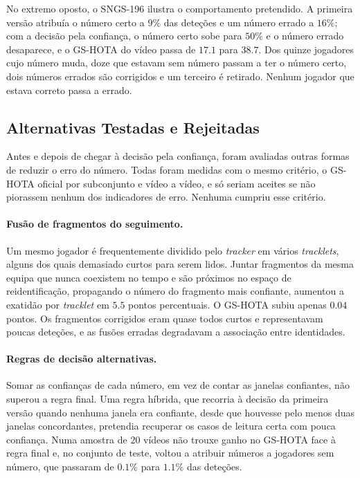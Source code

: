 No extremo oposto, o SNGS-196 ilustra o comportamento pretendido. A primeira versão atribuía o
número certo a $9\%$ das deteções e um número errado a $16\%$; com a decisão pela confiança, o
número certo sobe para $50\%$ e o número errado desaparece, e o GS-HOTA do vídeo passa de $17.1$
para $38.7$. Dos quinze jogadores cujo número muda, doze que estavam sem número passam a ter o
número certo, dois números errados são corrigidos e um terceiro é retirado. Nenhum jogador que
estava correto passa a errado.



\subsection{Alternativas Testadas e Rejeitadas}\label{sec:res_jnr_rejeitadas}

Antes e depois de chegar à decisão pela confiança, foram avaliadas outras formas de reduzir o erro
do número. Todas foram medidas com o mesmo critério, o GS-HOTA oficial por subconjunto e vídeo a
vídeo, e só seriam aceites se não piorassem nenhum dos indicadores de erro. Nenhuma cumpriu esse
critério.

\paragraph{Fusão de fragmentos do seguimento.} Um mesmo jogador é frequentemente dividido pelo
\emph{tracker} em vários \emph{tracklets}, alguns dos quais demasiado curtos para serem lidos.
Juntar fragmentos da mesma equipa que nunca coexistem no tempo e são próximos no espaço de
reidentificação, propagando o número do fragmento mais confiante, aumentou a exatidão por
\emph{tracklet} em $5.5$ pontos percentuais. O GS-HOTA subiu apenas $0.04$ pontos. Os fragmentos
corrigidos eram quase todos curtos e representavam poucas deteções, e as fusões erradas
degradavam a associação entre identidades.

\paragraph{Regras de decisão alternativas.} Somar as confianças de cada número, em vez de contar
as janelas confiantes, não superou a regra final. Uma regra híbrida, que recorria à decisão da
primeira versão quando nenhuma janela era confiante, desde que houvesse pelo menos duas janelas
concordantes, pretendia recuperar os casos de leitura certa com pouca confiança. Numa amostra de
$20$ vídeos não trouxe ganho no GS-HOTA face à regra final e, no conjunto de teste, voltou a
atribuir números a jogadores sem número, que passaram de $0.1\%$ para $1.1\%$ das deteções.

